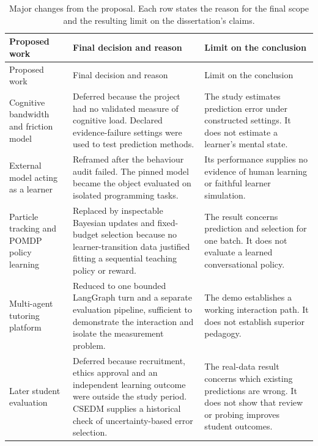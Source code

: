 \setlength{\LTcapwidth}{\textwidth}
\begin{longtable}{@{}>{\raggedright\arraybackslash}p{}@{\hspace{1.2em}}>{\raggedright\arraybackslash}p{}@{\hspace{1.2em}}>{\raggedright\arraybackslash}p{}@{}}
  \caption{Major changes from the proposal. Each row states the reason for the final scope and the resulting limit on the
  dissertation's claims.}
  \label{tab:proposal-changes} \\
    \toprule
    Proposed work & Final decision and reason & Limit on the conclusion \\
    \midrule
    \endfirsthead
    \toprule
    Proposed work & Final decision and reason & Limit on the conclusion \\
    \midrule
    \endhead
    Cognitive bandwidth and friction model & Deferred because the project had no validated measure of cognitive load. Declared
      evidence-failure settings were used to test prediction methods.
      & The study estimates prediction error under constructed settings. It does not estimate a learner's mental state. \\
    \addlinespace
    External model acting as a learner & Reframed after the behaviour audit failed. The pinned model became the object evaluated
      on isolated programming tasks.
      & Its performance supplies no evidence of human learning or faithful learner simulation. \\
    \addlinespace
    Particle tracking and POMDP policy learning & Replaced by inspectable Bayesian updates and fixed-budget selection because no
      learner-transition data justified fitting a sequential teaching policy or reward.
      & The result concerns prediction and selection for one batch. It does not evaluate a learned conversational policy. \\
    \addlinespace
    Multi-agent tutoring platform & Reduced to one bounded LangGraph turn and a separate evaluation pipeline, sufficient to
      demonstrate the interaction and isolate the measurement problem.
      & The demo establishes a working interaction path. It does not establish superior pedagogy. \\
    \addlinespace
    Later student evaluation & Deferred because recruitment, ethics approval and an independent learning outcome were outside
      the study period. CSEDM supplies a historical check of uncertainty-based error selection.
      & The real-data result concerns which existing predictions are wrong. It does not show that review or probing improves
      student outcomes. \\
    \bottomrule
\end{longtable}

